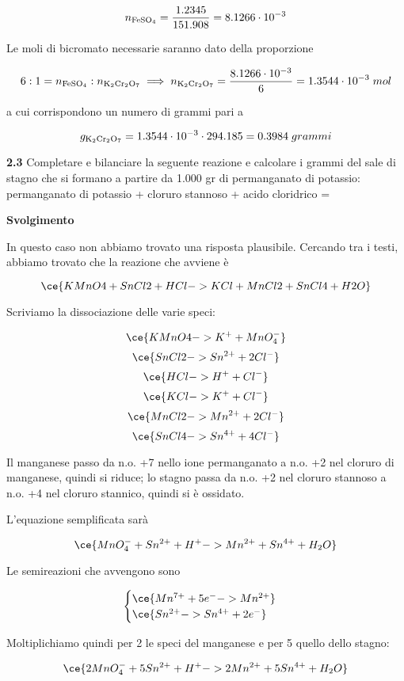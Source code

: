 $$n_{\rm FeSO_4}=\frac{1.2345}{151.908}=8.1266 \cdot 10^{-3}$$

Le moli di bicromato necessarie saranno dato della proporzione

$$6:1=n_{\rm FeSO_4}:n_{\rm K_2Cr_2O_7}
\implies
n_{\rm K_2Cr_2O_7}
=\frac{8.1266 \cdot 10^{-3}}{6}
=1.3544 \cdot 10^{-3}\;mol$$

a cui corrispondono un numero di grammi pari a

$$g_{\rm K_2Cr_2O_7}
=1.3544 \cdot 10^{-3} \cdot 294.185
=0.3984\;grammi$$

\vspace{0.2cm}\textbf{2.3} Completare e bilanciare la seguente reazione e calcolare i grammi del sale di stagno che si formano a partire da 1.000 gr di permanganato di potassio: 
permanganato di potassio + cloruro stannoso + acido cloridrico =

\vspace{0.2cm}\large\textbf{Svolgimento}\normalsize

\vspace{0.2cm}In questo caso non abbiamo trovato una risposta plausibile. Cercando tra i testi, abbiamo trovato che la reazione che avviene è

$$\ce{KMnO4 + SnCl2 + HCl -> KCl + MnCl2 + SnCl4 + H2O}$$

Scriviamo la dissociazione delle varie speci:

$$\ce{KMnO4 -> K^+ + MnO_4^-}$$
$$\ce{SnCl2 -> Sn^{2+} + 2Cl^-}$$
$$\ce{HCl -> H^+ + Cl^-}$$
$$\ce{KCl -> K^+ + Cl^-}$$
$$\ce{MnCl2 -> Mn^{2+} + 2Cl^-}$$
$$\ce{SnCl4 -> Sn^{4+} + 4Cl^-}$$

Il manganese passo da n.o. +7 nello ione permanganato a n.o. +2 nel cloruro di
manganese, quindi si riduce; lo stagno passa da n.o. +2 nel cloruro stannoso a n.o. +4 nel cloruro stannico, quindi si è ossidato.

L'equazione semplificata sarà

$$\ce{MnO_4^- + Sn^{2+} + H^+ -> Mn^{2+} + Sn^{4+} + H_2O}$$

Le semireazioni che avvengono sono

$$\begin{cases}
    \ce{Mn^{7+} + 5e^- -> Mn^{2+}}\\
    \ce{Sn^{2+} -> Sn^{4+} + 2e^-}
\end{cases}$$

Moltiplichiamo quindi per 2 le speci del manganese e per 5 quello dello stagno:

$$\ce{2MnO_4^- + 5Sn^{2+} + H^+ -> 2Mn^{2+} + 5Sn^{4+} + H_2O}$$

